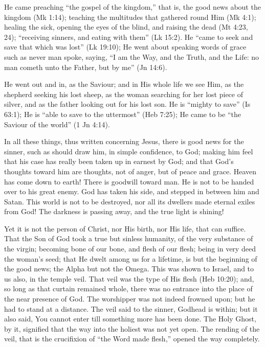 \documentclass[
]{book}
\begin{document}
He came preaching ``the gospel of the kingdom,'' that is, the good news about the kingdom (Mk 1:14); teaching the multitudes that gathered round Him (Mk 4:1); healing the sick, opening the eyes of the blind, and raising the dead (Mt 4:23, 24); ``receiving sinners, and eating with them'' (Lk 15:2). He ``came to seek and save that which was lost'' (Lk 19:10); He went about speaking words of grace such as never man spoke, saying, ``I am the Way, and the Truth, and the Life: no man cometh unto the Father, but by me'' (Jn 14:6).

He went out and in, as the Saviour; and in His whole life we see Him, as the shepherd seeking his lost sheep, as the woman searching for her lost piece of silver, and as the father looking out for his lost son. He is ``mighty to save'' (Is 63:1); He is ``able to save to the uttermost'' (Heb 7:25); He came to be ``the Saviour of the world'' (1 Jn 4:14).

In all these things, thus written concerning Jesus, there is good news for the sinner, such as should draw him, in simple confidence, to God; making him feel that his case has really been taken up in earnest by God; and that God's thoughts toward him are thoughts, not of anger, but of peace and grace. Heaven has come down to earth! There is goodwill toward man. He is not to be handed over to his great enemy. God has taken his side, and stepped in between him and Satan. This world is not to be destroyed, nor all its dwellers made eternal exiles from God! The darkness is passing away, and the true light is shining!

Yet it is not the person of Christ, nor His birth, nor His life, that can suffice. That the Son of God took a true but sinless humanity, of the very substance of the virgin; becoming bone of our bone, and flesh of our flesh; being in very deed the woman's seed; that He dwelt among us for a lifetime, is but the beginning of the good news; the Alpha but not the Omega. This was shown to Israel, and to us also, in the temple veil. That veil was the type of His flesh (Heb 10:20); and, so long as that curtain remained whole, there was no entrance into the place of the near presence of God. The worshipper was not indeed frowned upon; but he had to stand at a distance. The veil said to the sinner, Godhead is within; but it also said, You cannot enter till something more has been done. The Holy Ghost, by it, signified that the way into the holiest was not yet open. The rending of the veil, that is the crucifixion of ``the Word made flesh,'' opened the way completely.
\end{document}
